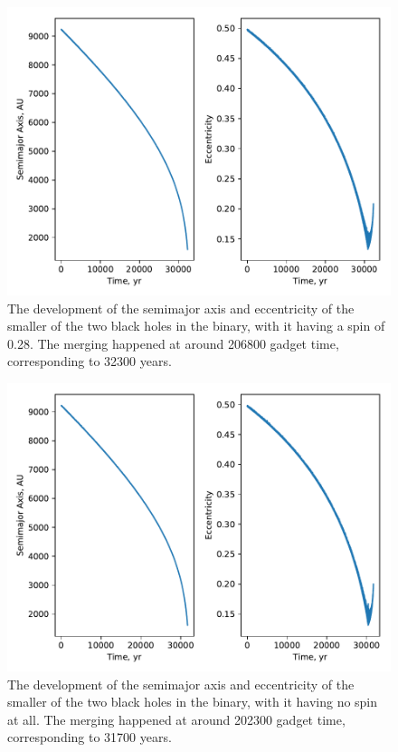\documentclass[english, oneside]{HYgradu}
\begin{document}
\begin{figure}[h!tb]
\centering
\includegraphics[width=\textwidth]{../images/spinNormal.pdf}
\caption{The development of the semimajor axis and eccentricity of the smaller of the two black holes in the binary, with it having a spin of 0.28. The merging happened at around 206800 gadget time, corresponding to 32300 years.}
\label{fig:spinNormal}
\end{figure}

\begin{figure}[h!tb]
\centering
\includegraphics[width=\textwidth]{../images/spin0.pdf}
\caption{The development of the semimajor axis and eccentricity of the smaller of the two black holes in the binary, with it having no spin at all. The merging happened at around 202300 gadget time, corresponding to 31700 years.}
\label{fig:spin0}
\end{figure}
\end{document}
